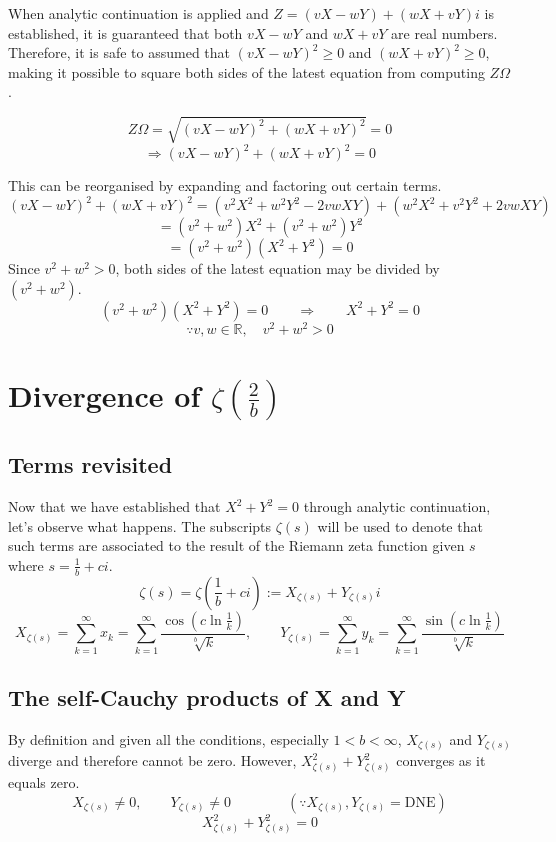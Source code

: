 \documentclass{amsart}
\begin{document}
	
	When analytic continuation is applied and $Z = (vX - wY) + (wX + vY)i$ is established, it is guaranteed that both $vX - wY$ and $wX + vY$ are real numbers. Therefore, it is safe to assumed that $(vX-wY)^2 \geq 0$ and $(wX+vY)^2 \geq 0$, making it possible to square both sides of the latest equation from computing $Z\Omega$.
	
	
	\[ Z\Omega =  \sqrt{(vX-wY)^2 + (wX+vY)^2} = 0 \]
	\[ \Rightarrow (vX-wY)^2 + (wX+vY)^2 = 0 \]
	
	This can be reorganised by expanding and factoring out certain terms.
	\[ (vX-wY)^2 + (wX+vY)^2 = (v^2X^2 + w^2Y^2 - 2vwXY) + (w^2X^2 + v^2Y^2 + 2vwXY) \]
	\[ = (v^2 + w^2)X^2 + (v^2 + w^2)Y^2 \]
	\[ = (v^2 + w^2)(X^2+Y^2) = 0 \]
	Since $v^2 + w^2 >0$, both sides of the latest equation may be divided by $(v^2 + w^2)$.
	\[ (v^2 + w^2)(X^2+Y^2) = 0 \qquad \Rightarrow \qquad X^2+Y^2 = 0 \]
	\[ \because v, w \in \mathbb{R}, \quad v^2 + w^2 > 0 \]
	\[  \]
	
	
	
	\section{Divergence of $\zeta(\frac{2}{b})$}
	\subsection{Terms revisited}
	Now that we have established that $X^2+Y^2 = 0$ through analytic continuation, let's observe what happens. The subscripts $\zeta(s)$ will be used to denote that such terms are associated to the result of the Riemann zeta function given $s$ where $s=\frac{1}{b}+ci$.
	\[ \zeta(s) = \zeta(\frac{1}{b}+ci) := X_{\zeta(s)} + Y_{\zeta(s)}i \]
	\[ X_{\zeta(s)} = \sum\limits_{k=1}^{\infty}x_k = \sum\limits_{k=1}^{\infty}\frac{\cos({c\ln \frac{1}{k}})}{\sqrt[b]{k}}, \qquad Y_{\zeta(s)} = \sum\limits_{k=1}^{\infty}y_k = \sum\limits_{k=1}^{\infty}\frac{\sin({c\ln \frac{1}{k}})}{\sqrt[b]{k}} \]
	
	\subsection{The self-Cauchy products of X and Y}
	By definition and given all the conditions, especially $1<b<\infty$, $X_{\zeta(s)}$ and $Y_{\zeta(s)}$ diverge and therefore cannot be zero. However, $X_{\zeta(s)}^2+Y_{\zeta(s)}^2$ converges as it equals zero.
	\[ X_{\zeta(s)} \neq 0, \qquad Y_{\zeta(s)} \neq 0 \qquad\qquad (\because X_{\zeta(s)}, Y_{\zeta(s)} = \text{DNE}) \]
	\[ X_{\zeta(s)}^2+Y_{\zeta(s)}^2 = 0 \]
	
\end{document}
